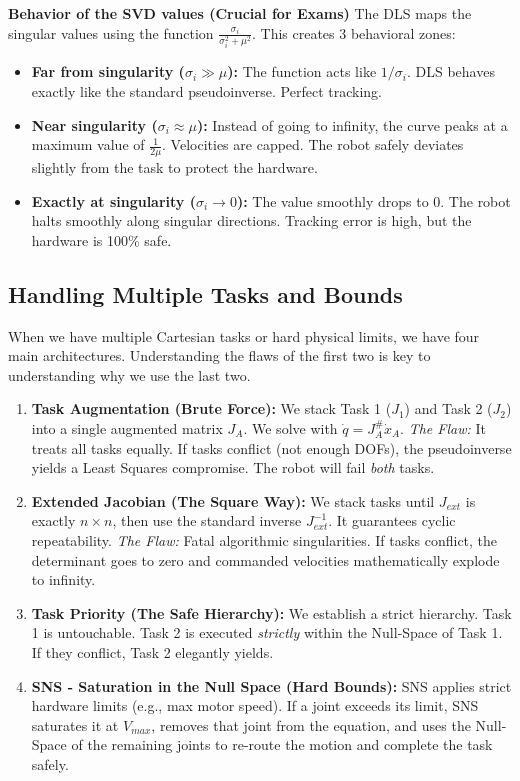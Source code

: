 \documentclass[11pt,a4paper]{article}
\begin{document}
\textbf{Behavior of the SVD values (Crucial for Exams)}
The DLS maps the singular values using the function $\frac{\sigma_i}{\sigma_i^2 + \mu^2}$. This creates 3 behavioral zones:
\begin{itemize}
    \item \textbf{Far from singularity ($\sigma_i \gg \mu$):} The function acts like $1/\sigma_i$. DLS behaves exactly like the standard pseudoinverse. Perfect tracking.
    \item \textbf{Near singularity ($\sigma_i \approx \mu$):} Instead of going to infinity, the curve peaks at a maximum value of $\frac{1}{2\mu}$. Velocities are capped. The robot safely deviates slightly from the task to protect the hardware.
    \item \textbf{Exactly at singularity ($\sigma_i \to 0$):} The value smoothly drops to $0$. The robot halts smoothly along singular directions. Tracking error is high, but the hardware is 100\% safe.
\end{itemize}
 

\subsection{Handling Multiple Tasks and Bounds}
When we have multiple Cartesian tasks or hard physical limits, we have four main architectures. Understanding the flaws of the first two is key to understanding why we use the last two.

\begin{enumerate}
    \item \textbf{Task Augmentation (Brute Force):} We stack Task 1 ($J_1$) and Task 2 ($J_2$) into a single augmented matrix $J_A$. We solve with $\dot{q} = J_A^\# \dot{x}_A$. 
    \textit{The Flaw:} It treats all tasks equally. If tasks conflict (not enough DOFs), the pseudoinverse yields a Least Squares compromise. The robot will fail \textit{both} tasks.
    
    \item \textbf{Extended Jacobian (The Square Way):} We stack tasks until $J_{ext}$ is exactly $n \times n$, then use the standard inverse $J_{ext}^{-1}$. It guarantees cyclic repeatability.
    \textit{The Flaw:} Fatal algorithmic singularities. If tasks conflict, the determinant goes to zero and commanded velocities mathematically explode to infinity.
    
    \item \textbf{Task Priority (The Safe Hierarchy):} We establish a strict hierarchy. Task 1 is untouchable. Task 2 is executed \textit{strictly} within the Null-Space of Task 1. If they conflict, Task 2 elegantly yields.
    
    \item \textbf{SNS - Saturation in the Null Space (Hard Bounds):} SNS applies strict hardware limits (e.g., max motor speed). If a joint exceeds its limit, SNS saturates it at $V_{max}$, removes that joint from the equation, and uses the Null-Space of the remaining joints to re-route the motion and complete the task safely.
\end{enumerate}
\end{document}
